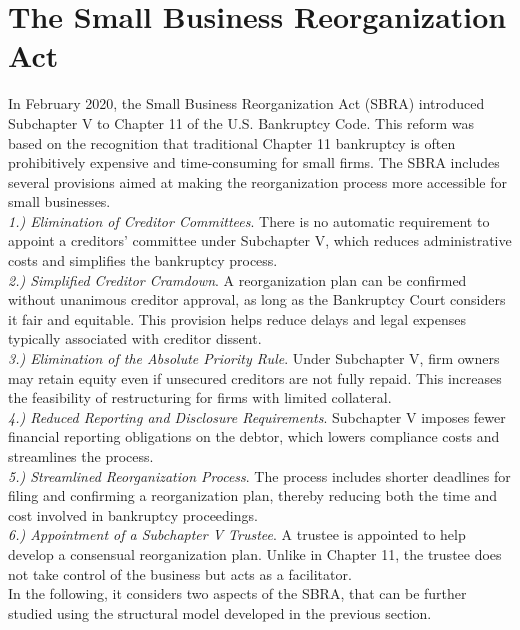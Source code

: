 \documentclass[12pt]{article}
\begin{document}
\section{The Small Business Reorganization Act}
In February 2020, the Small Business Reorganization Act (SBRA) introduced Subchapter V to Chapter 11 of the U.S. Bankruptcy Code. This reform was based on the recognition that traditional Chapter 11 bankruptcy is often prohibitively expensive and time-consuming for small firms. The SBRA includes several provisions aimed at making the reorganization process more accessible for small businesses. \vspace{3mm} \\
\textit{1.) Elimination of Creditor Committees}. There is no automatic requirement to appoint a creditors' committee under Subchapter V, which reduces administrative costs and simplifies the bankruptcy process. \vspace{3mm} \\
\textit{2.) Simplified Creditor Cramdown}. A reorganization plan can be confirmed without unanimous creditor approval, as long as the Bankruptcy Court considers it fair and equitable. This provision helps reduce delays and legal expenses typically associated with creditor dissent. \vspace{3mm} \\
\textit{3.) Elimination of the Absolute Priority Rule}. Under Subchapter V, firm owners may retain equity even if unsecured creditors are not fully repaid. This increases the feasibility of restructuring for firms with limited collateral. \vspace{3mm} \\
\textit{4.) Reduced Reporting and Disclosure Requirements}. Subchapter V imposes fewer financial reporting obligations on the debtor, which lowers compliance costs and streamlines the process. \vspace{3mm} \\
\textit{5.) Streamlined Reorganization Process}. The process includes shorter deadlines for filing and confirming a reorganization plan, thereby reducing both the time and cost involved in bankruptcy proceedings. \vspace{3mm} \\
\textit{6.) Appointment of a Subchapter V Trustee}. A trustee is appointed to help develop a consensual reorganization plan. Unlike in Chapter 11, the trustee does not take control of the business but acts as a facilitator. \vspace{3mm} \\
In the following, it considers two aspects of the SBRA, that can be further studied using the structural model developed in the previous section. 
\end{document}
